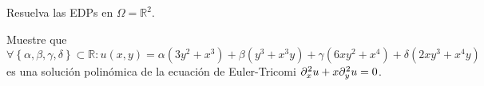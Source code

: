 Resuelva las EDPs en $\Omega=\mathbb{R}^{2}$.
\begin{multicols}{3}
\end{multicols}

\question

Muestre que
\begin{equation*}
	\forall\left\{\alpha,\beta,\gamma,\delta\right\}\subset
	\mathbb{R}:
	u\left(x,y\right)=
	\alpha\left(3y^{2}+x^{3}\right)+
	\beta\left(y^{3}+x^{3}y\right)+
	\gamma\left(6xy^{2}+x^{4}\right)+
	\delta\left(2xy^{3}+x^{4}y\right)
\end{equation*}
es una solución polinómica de la ecuación de Euler-Tricomi
\begin{math}
	\difcp[2]{u}{x}+
	x\difcp[2]{u}{y}=
	0
\end{math}.

